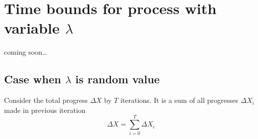 \documentclass[12pt, a4paper]{article}
\theoremstyle{remark}
\newcommand{\cm}{coming soon\dots}
\begin{document}














\section{Time bounds for process with variable $\lambda$}
\cm
\subsection{Case when $\lambda$ is random value}
Consider the total progress $\Delta X$ by $T$ iterations. It is a sum of all progresses $\Delta X_i$ made in previous iteration
\[
    \Delta X = \sum_{i = 0}^{T} \Delta X_i
\]
\end{document}
